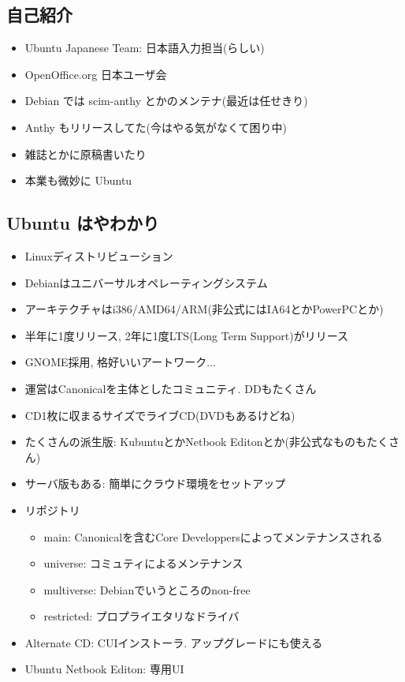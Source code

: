 \documentclass[mingoth,a4paper]{jsarticle}
\begin{document}
\begin{multicols}{2}

\subsection{自己紹介}

\begin{itemize}
      \item Ubuntu Japanese Team: 日本語入力担当(らしい)
      \item OpenOffice.org 日本ユーザ会
      \item Debian では scim-anthy とかのメンテナ(最近は任せきり)
      \item Anthy もリリースしてた(今はやる気がなくて困り中)
      \item 雑誌とかに原稿書いたり
      \item 本業も微妙に Ubuntu
\end{itemize}

\subsection{Ubuntu はやわかり}
\begin{itemize}
      \item Linuxディストリビューション\\
      \item Debianはユニバーサルオペレーティングシステム
      \item アーキテクチャはi386/AMD64/ARM(非公式にはIA64とかPowerPCとか)
      \item 半年に1度リリース, 2年に1度LTS(Long Term Support)がリリース
      \item GNOME採用, 格好いいアートワーク...
      \item 運営はCanonicalを主体としたコミュニティ. DDもたくさん
      \item CD1枚に収まるサイズでライブCD(DVDもあるけどね)
      \item たくさんの派生版: KubuntuとかNetbook Editonとか(非公式なものもたくさん)
      \item サーバ版もある: 簡単にクラウド環境をセットアップ
      \item リポジトリ
    \begin{itemize}
          \item main: Canonicalを含むCore Developpersによってメンテナンスされる
          \item universe: コミュティによるメンテナンス
          \item multiverse: Debianでいうところのnon-free
          \item restricted: プロプライエタリなドライバ
    \end{itemize}
      \item Alternate CD: CUIインストーラ. アップグレードにも使える
      \item Ubuntu Netbook Editon: 専用UI
\end{itemize}


\end{multicols}
\end{document}
